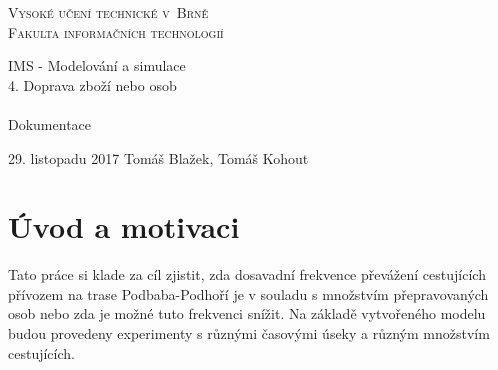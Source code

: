 \documentclass[11pt,a4paper]{article}
\author{Tomáš Kohout}
\begin{document}



\newcommand{\slideRef}[1]{\textit{(IMS slide #1)}}
\newcommand{\code}[1]{\texttt{#1}}

	\begin{titlepage}

		\begin{center}

			\textsc{
				\Huge
					Vysoké učení technické v~Brně\\
				\huge
					Fakulta informačních technologií
			}\\


			\LARGE
					IMS - Modelování a simulace\\
					4. Doprava zboží nebo osob\\~\\
			\Huge{}
					Dokumentace

		\end{center}

		{\Large
			29. listopadu 2017
			\hfill
			Tomáš Blažek, Tomáš Kohout
		}

	\end{titlepage}

	\tableofcontents

	\pagebreak


	\section{Úvod a motivaci}
		Tato práce si klade za cíl zjistit, zda dosavadní frekvence převážení cestujících přívozem na trase Podbaba-Podhoří je v
    souladu s množstvím přepravovaných osob nebo zda je možné tuto frekvenci snížit. Na základě vytvořeného modelu
    budou provedeny experimenty s různými časovými úseky a různým množstvím cestujících.
\end{document}

